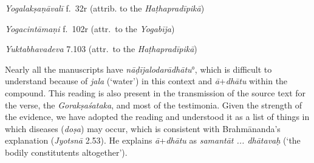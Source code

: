 \begin{ekdosis}
\begin{testimonia}[hp02_053]
\begin{versinnote}
\tl{nāḍījālodarādhātu° ] nāḍījalodaradhātu° \textup{J,P;} nāḍījalodaraṃ dhātu° \textup{N, n1, n4}\\+}
\end{versinnote}

\emph{Yogalakṣaṇāvalī} f.~32r (attrib. to the \emph{Haṭhapradīpikā})
\begin{versinnote}
\end{versinnote}

\emph{Yogacintāmaṇi} f.~102r (attr.~to the \emph{Yogabīja})

\begin{versinnote}
\end{versinnote}

\emph{Yuktabhavadeva} 7.103 (attr.~to the \emph{Haṭhapradīpikā})

\begin{versinnote} 
\end{versinnote}

\end{testimonia}

\begin{philcomm}[hp02_053]
Nearly all the manuscripts have \emph{nāḍījalodarādhātu}°, which is difficult to understand because of \emph{jala} (`water') in this context and \emph{ā}+\emph{dhātu} within the compound. This reading is also present in the transmission of the source text for the verse, the \emph{Gorakṣaśataka}, and most of the testimonia. Given the strength of the evidence, we have adopted the reading and understood it as a list of things in which diseases (\emph{doṣa}) may occur, which is consistent with Brahmānanda's explanation (\emph{Jyotsnā} 2.53). He explains \emph{ā}+\emph{dhātu} as \emph{samantāt ... dhātavaḥ} (`the bodily constitutents altogether').\lb


\end{philcomm}
\end{ekdosis}
